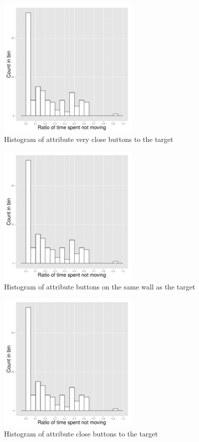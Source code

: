 \begin{figure}[!htbp]
  \centering
	\includegraphics[page=6,width=0.6\textwidth]{Images/chains_features_ML}
	\caption{Histogram of attribute very close buttons to the target}
	\label{fig:chains-distrib-veryclose}
\end{figure}

\begin{figure}[!htbp]
  \centering
	\includegraphics[page=7,width=0.6\textwidth]{Images/chains_features_ML}
	\caption{Histogram of attribute buttons on the same wall as the target}
	\label{fig:chains-distrib-samewall}
\end{figure}

\begin{figure}[!htbp]
  \centering
	\includegraphics[page=8,width=0.6\textwidth]{Images/chains_features_ML}
	\caption{Histogram of attribute close buttons to the target}
	\label{fig:chains-distrib-close}
\end{figure}

